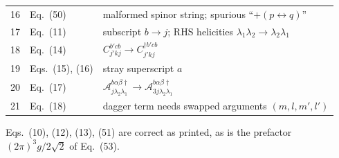 \documentclass[11pt]{article}
\newcommand{\dg}{\dagger}
\begin{document}
\begin{center}
\begin{longtable}{clp{9.4cm}}
16 & Eq.~(50) & malformed spinor string; spurious ``$+(p\leftrightarrow q)$''\\
17 & Eq.~(11) & subscript $b\to j$; RHS helicities $\lambda_1\lambda_2\to\lambda_2\lambda_1$\\
18 & Eq.~(14) & $C^{b'cb}_{j'kj}\to C^{\dg b'cb}_{j'kj}$\\
19 & Eqs.~(15), (16) & stray superscript $a$\\
20 & Eq.~(17) & $\mathcal A^{b\alpha\beta\dg}_{j\lambda_2\lambda_1}
\to\mathcal A^{b\alpha\beta\dg}_{3j\lambda_2\lambda_1}$\\
21 & Eq.~(18) & dagger term needs swapped arguments $(m,l,m',l')$\\
\hline
\end{longtable}
\end{center}

\noindent
Eqs.~(10), (12), (13), (51) are correct as printed, as is the prefactor
$(2\pi)^{3}g/2\sqrt2$ of Eq.~(53).
\end{document}
